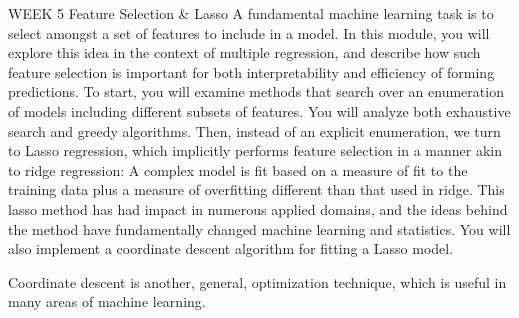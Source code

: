 
WEEK 5
Feature Selection & Lasso
A fundamental machine learning task is to select amongst a set of features to include in a model. In this module, you will explore this idea in the context of multiple regression, and describe how such feature selection is important for both interpretability and efficiency of forming predictions.
To start, you will examine methods that search over an enumeration of models including different subsets of features. You will analyze both exhaustive search and greedy algorithms. Then, instead of an explicit enumeration, we turn to Lasso regression, which implicitly performs feature selection in a manner akin to ridge regression: A complex model is fit based on a measure of fit to the training data plus a measure of overfitting different than that used in ridge. This lasso method has had impact in numerous applied domains, and the ideas behind the method have fundamentally changed machine learning and statistics. You will also implement a coordinate descent algorithm for fitting a Lasso model.

Coordinate descent is another, general, optimization technique, which is useful in many areas of machine learning.


